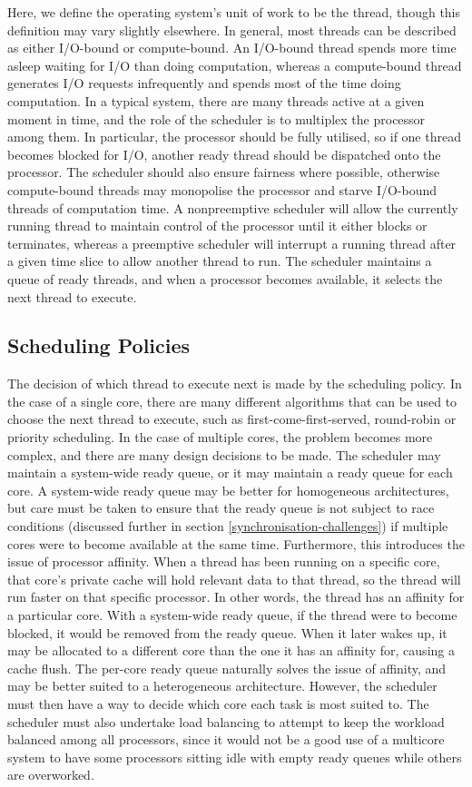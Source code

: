 \documentclass[bsc,frontabs,singlespacing,parskip,deptreport]{infthesis}
\begin{document}
Here, we define the operating system's unit of work to be the thread, though this definition may vary slightly elsewhere. In general, most threads can be described as either I/O-bound or compute-bound. An I/O-bound thread spends more time asleep waiting for I/O than doing computation, whereas a compute-bound thread generates I/O requests infrequently and spends most of the time doing computation. In a typical system, there are many threads active at a given moment in time, and the role of the scheduler is to multiplex the processor among them. In particular, the processor should be fully utilised, so if one thread becomes blocked for I/O, another ready thread should be dispatched onto the processor. The scheduler should also ensure fairness where possible, otherwise compute-bound threads may monopolise the processor and starve I/O-bound threads of computation time. A nonpreemptive scheduler will allow the currently running thread to maintain control of the processor until it either blocks or terminates, whereas a preemptive scheduler will interrupt a running thread after a given time slice to allow another thread to run. The scheduler maintains a queue of ready threads, and when a processor becomes available, it selects the next thread to execute.

\subsection{Scheduling Policies}
\label{scheduling-challenges}
The decision of which thread to execute next is made by the scheduling policy. In the case of a single core, there are many different algorithms that can be used to choose the next thread to execute, such as first-come-first-served, round-robin or priority scheduling. In the case of multiple cores, the problem becomes more complex, and there are many design decisions to be made. The scheduler may maintain a system-wide ready queue, or it may maintain a ready queue for each core. A system-wide ready queue may be better for homogeneous architectures, but care must be taken to ensure that the ready queue is not subject to race conditions (discussed further in section \ref{synchronisation-challenges}) if multiple cores were to become available at the same time. Furthermore, this introduces the issue of processor affinity. When a thread has been running on a specific core, that core’s private cache will hold relevant data to that thread, so the thread will run faster on that specific processor. In other words, the thread has an affinity for a particular core. With a system-wide ready queue, if the thread were to become blocked, it would be removed from the ready queue. When it later wakes up, it may be allocated to a different core than the one it has an affinity for, causing a cache flush. The per-core ready queue naturally solves the issue of affinity, and may be better suited to a heterogeneous architecture. However, the scheduler must then have a way to decide which core each task is most suited to. The scheduler must also undertake load balancing to attempt to keep the workload balanced among all processors, since it would not be a good use of a multicore system to have some processors sitting idle with empty ready queues while others are overworked. 
\end{document}
